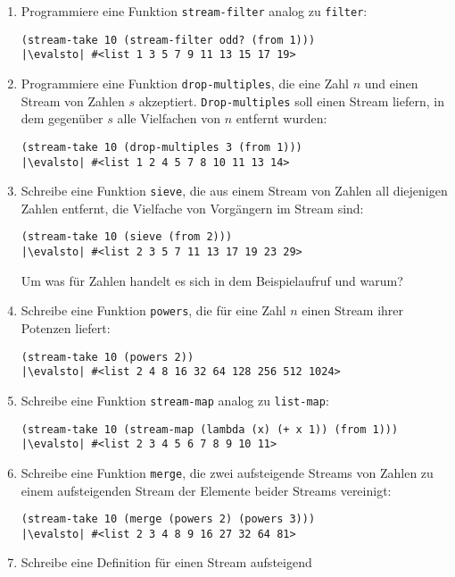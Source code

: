 \begin{aufgabe}
\begin{enumerate}
\begin{lstlisting}
     \end{lstlisting}
   \item Programmiere eine Funktion \texttt{stream-filter} analog zu
     \texttt{filter}:
     \begin{lstlisting}
(stream-take 10 (stream-filter odd? (from 1)))
|\evalsto| #<list 1 3 5 7 9 11 13 15 17 19>
     \end{lstlisting}
   \item Programmiere eine Funktion \texttt{drop-multiples}, die 
     eine Zahl $n$ und einen Stream von Zahlen $s$ akzeptiert.
     \texttt{Drop-multiples} soll einen Stream liefern, in dem
     gegenüber $s$  alle Vielfachen von $n$ entfernt wurden:
     \begin{lstlisting}
(stream-take 10 (drop-multiples 3 (from 1)))
|\evalsto| #<list 1 2 4 5 7 8 10 11 13 14>
     \end{lstlisting}
   \item Schreibe eine Funktion \texttt{sieve}, die aus einem Stream
     von Zahlen all diejenigen Zahlen entfernt, die Vielfache von
     Vorgängern im Stream sind:
     \begin{lstlisting}
(stream-take 10 (sieve (from 2)))
|\evalsto| #<list 2 3 5 7 11 13 17 19 23 29>
     \end{lstlisting}
     Um was für Zahlen handelt es sich in dem Beispielaufruf und
     warum?
   \item Schreibe eine Funktion \texttt{powers}, die für eine Zahl
     $n$ einen Stream ihrer Potenzen liefert:
     \begin{lstlisting}
(stream-take 10 (powers 2))
|\evalsto| #<list 2 4 8 16 32 64 128 256 512 1024>
     \end{lstlisting}
   \item Schreibe eine Funktion \texttt{stream-map} analog zu
     \texttt{list-map}:
     \begin{lstlisting}
(stream-take 10 (stream-map (lambda (x) (+ x 1)) (from 1)))
|\evalsto| #<list 2 3 4 5 6 7 8 9 10 11>
     \end{lstlisting}
   \item Schreibe eine Funktion \texttt{merge}, die zwei
     aufsteigende Streams von Zahlen zu einem aufsteigenden Stream
     der Elemente beider Streams vereinigt:
     \begin{lstlisting}
(stream-take 10 (merge (powers 2) (powers 3)))
|\evalsto| #<list 2 3 4 8 9 16 27 32 64 81>
     \end{lstlisting}
   \item Schreibe eine Definition für einen Stream aufsteigend

\end{enumerate}
\end{aufgabe}
